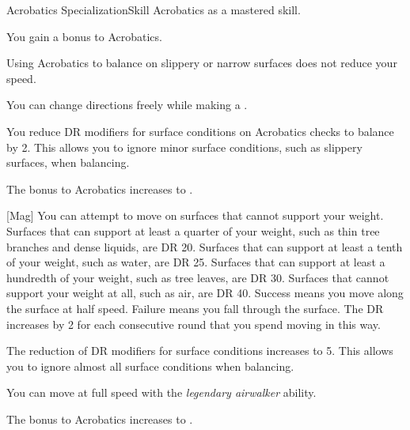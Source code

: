     \begin{feat}{Acrobatics Specialization}{Skill}
        \featpre Acrobatics as a mastered skill.
        
         You gain a  bonus to Acrobatics.

         Using Acrobatics to balance on slippery or narrow surfaces does not reduce your speed.

         You can change directions freely while making a .

         You reduce DR modifiers for surface conditions on Acrobatics checks to balance by 2.
        This allows you to ignore minor surface conditions, such as slippery surfaces, when balancing.

         The bonus to Acrobatics increases to .

        [Mag] You can attempt to move on surfaces that cannot support your weight.
        Surfaces that can support at least a quarter of your weight, such as thin tree branches and dense liquids, are DR 20.
        Surfaces that can support at least a tenth of your weight, such as water, are DR 25.
        Surfaces that can support at least a hundredth of your weight, such as tree leaves, are DR 30.
        Surfaces that cannot support your weight at all, such as air, are DR 40.
        Success means you move along the surface at half speed.
        Failure means you fall through the surface.
        The DR increases by 2 for each consecutive round that you spend moving in this way.

         The reduction of DR modifiers for surface conditions increases to 5.
        This allows you to ignore almost all surface conditions when balancing.

         You can move at full speed with the \textit{legendary airwalker} ability.

         The bonus to Acrobatics increases to .

        \ff[18]{} 
    \end{feat}

